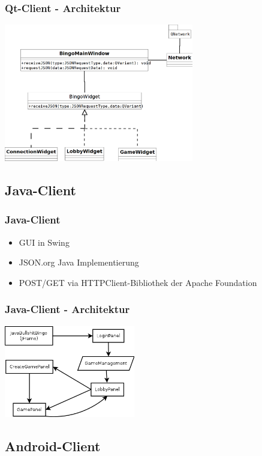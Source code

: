\documentclass{beamer}
\begin{document}
\begin{frame}[fragile]
\frametitle{Qt-Client - Architektur}
\begin{center}
\includegraphics[height=6cm]{qt-klassendiagramm.png}
\end{center}
\end{frame}


\subsection{Java-Client}
\begin{frame}[fragile]
\frametitle{Java-Client}
\begin{itemize}
\item GUI in Swing
\item JSON.org Java Implementierung
\item POST/GET via HTTPClient-Bibliothek der Apache Foundation
\end{itemize}
\end{frame}

\begin{frame}[fragile]
\frametitle{Java-Client - Architektur}
\begin{center}
\includegraphics[height=4cm]{JBB_Aufbau.png}
\end{center}
\end{frame}

\subsection{Android-Client}
\end{document}
